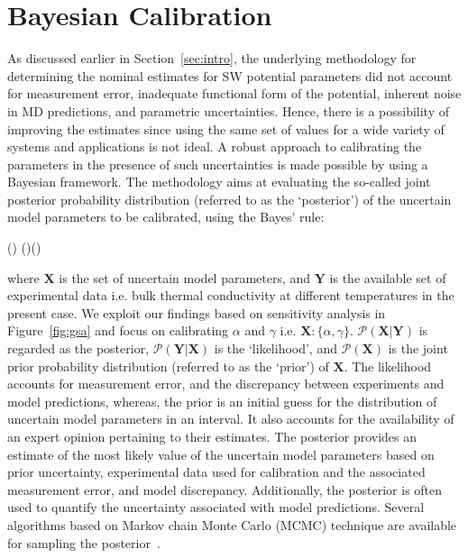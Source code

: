 \section{Bayesian Calibration}
\label{sec:bayes}

As discussed earlier in Section~\ref{sec:intro}, the underlying methodology for determining the nominal 
estimates for SW potential parameters did not account for measurement error, inadequate functional
form of the potential, inherent noise in MD predictions, and parametric uncertainties. Hence, there is
a possibility of improving the estimates since using the same set of values for a wide variety of systems
and applications is not ideal. A robust approach to calibrating the parameters in the presence of
such uncertainties is made possible by using a Bayesian framework. The methodology aims at evaluating
the so-called joint posterior probability distribution (referred to as the `posterior') of the uncertain model 
parameters to be calibrated, using the Bayes' rule:

\be
{}(\vert {}) \propto {}(\vert{})()
\ee

\noindent where $\bm{X}$ is the set of uncertain model parameters, and $\bm{Y}$ is the available set of
experimental data i.e. bulk thermal conductivity at different temperatures in the present case. 
We exploit our findings based on sensitivity analysis in
Figure~\ref{fig:gsa} and focus on calibrating $\alpha$ and $\gamma$ i.e. $\bm{X}:\{\alpha,\gamma\}$.
$\mathcal{P}(\bm{X}\vert \bm{Y})$ is regarded as the posterior, $\mathcal{P}(\bm{Y}\vert\bm{X})$ is the
`likelihood', and $\mathcal{P}(\bm{X})$ is the joint prior probability distribution (referred to as the `prior') of $\bm{X}$.
The likelihood accounts for measurement error, and the discrepancy between experiments and model
predictions, whereas, the prior is an initial guess for the distribution of uncertain model parameters in an
interval. It also accounts for the availability of an expert opinion pertaining to their estimates. 
The posterior provides an estimate of the most likely value of the uncertain model parameters based on
prior uncertainty, experimental data used for calibration and the associated measurement error, and model
discrepancy. Additionally, the posterior is often used to quantify the uncertainty associated with model predictions. Several algorithms based on Markov chain Monte Carlo (MCMC) technique are available for  
sampling the posterior~\cite{Haario:2001, Haario:2006,Xu:2014}.

